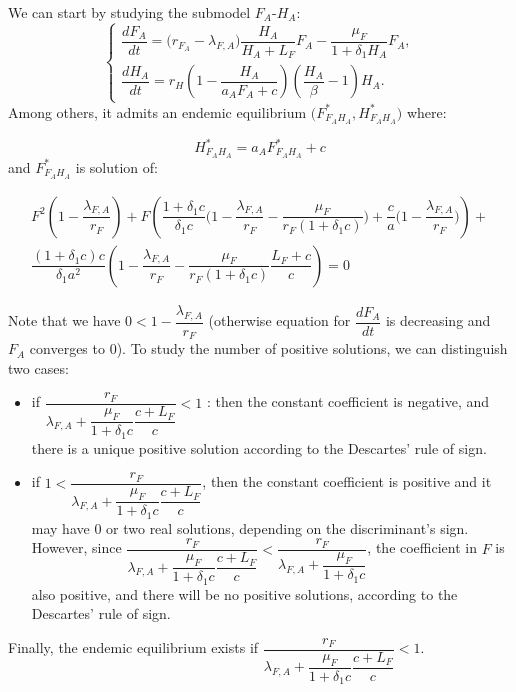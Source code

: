 \documentclass{article}
\newcommand{\lfa}{\lambda_{F, A}}
\begin{document}
We can start by studying the submodel $F_A$-$H_A$:
\begin{equation}
\left\{ \begin{array}{l}
\dfrac{dF_{A}}{dt}= \Big(r_{F_A} - \lfa \Big)  \dfrac{H_A}{H_A+L_F}F_A - \dfrac{\mu_{F}}{1 +\delta_1 H_A}F_A,\\
\dfrac{dH_A}{dt}=r_{H}\left(1-\dfrac{H_A}{a_{A}F_{A} +  c}\right)\left(\dfrac{H_A}{\beta}-1\right)H_A.
\end{array}\right.
\end{equation}
Among others, it admits an endemic equilibrium $\Big(F_{F_AH_A}^*, H_{F_AH_A}^* \Big)$ where:

$$
H_{F_AH_A}^* = a_A F_{F_AH_A}^* + c
$$
and $F_{F_AH_A}^*$ is solution of:

\begin{multline}
F^2 \left(1 - \dfrac{\lfa}{r_F}\right) + F \left( \dfrac{1 + \delta_1 c}{\delta_1 c} \Big(1-\dfrac{\lfa}{r_F} - \dfrac{\mu_F}{r_F(1+\delta_1 c)} \Big) + \dfrac{c}{a} \Big(1-\dfrac{\lfa}{r_F} \Big) \right) + \\
\dfrac{(1+\delta_1 c)c}{\delta_1 a^2} \left(1-\dfrac{\lfa}{r_F} - \dfrac{\mu_F}{r_F(1+\delta_1 c)} \dfrac{L_F + c}{c} \right) = 0
\end{multline}

Note that we have  $0 < 1 - \dfrac{\lfa}{r_F}$ (otherwise equation for $\dfrac{dF_A}{dt}$ is decreasing and $F_A$ converges to 0).
To study the number of positive solutions, we can distinguish two cases:

\begin{itemize}
\item if $\dfrac{r_F}{\lfa + \dfrac{\mu_F}{1 + \delta_1 c} \dfrac{c + L_F}{c}} < 1$ : then the constant coefficient is negative, and there is a unique positive solution according to the Descartes' rule of sign.
\item if $1 < \dfrac{r_F}{\lfa + \dfrac{\mu_F}{1 + \delta_1 c} \dfrac{c + L_F}{c}}$, then the constant coefficient is positive and it may have 0 or two real solutions, depending on the discriminant's sign. However, since $\dfrac{r_F}{\lfa + \dfrac{\mu_F}{1 + \delta_1 c} \dfrac{c + L_F}{c}} < \dfrac{r_F}{\lfa + \dfrac{\mu_F}{1 + \delta_1 c} }$, the coefficient in $F$ is also positive, and there will be no positive solutions,  according to the Descartes' rule of sign.
\end{itemize}

Finally, the endemic equilibrium exists if $\dfrac{r_F}{\lfa + \dfrac{\mu_F}{1 + \delta_1 c} \dfrac{c + L_F}{c}} < 1$.
\end{document}
